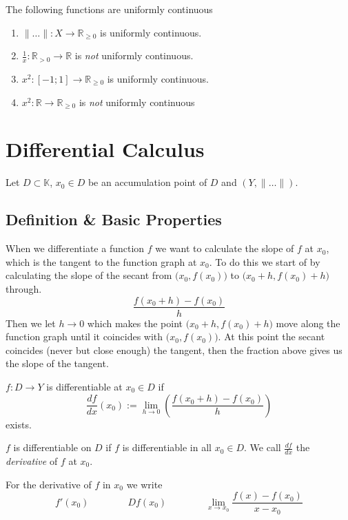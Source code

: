 \begin{proposition}
   The following functions are uniformly continuous
   \begin{enumerate}[label=\roman*, align=Center]
      \item \(\|\ldots\|: X \to \mathbb{R}_{\geq 0}\) is uniformly continuous.
      \item \(\frac{1}{x}: \mathbb{R}_{>0} \to \mathbb{R}\) is \emph{not} uniformly continuous.
      \item \(x^2: [-1; 1] \to \mathbb{R}_{\geq 0}\) is uniformly continuous.
      \item \(x^2: \mathbb{R} \to \mathbb{R}_{\geq 0}\) is \emph{not} uniformly continuous
   \end{enumerate}
\end{proposition}

\newpage

\section{Differential Calculus}
Let \(D \subset \mathbb{K}\), \(x_0 \in D\) be an accumulation point of \(D\) and \((Y, \|\ldots\|)\).

\subsection{Definition \& Basic Properties}
When we differentiate a function \(f\) we want to calculate the slope of \(f\) at \(x_0\), which is the tangent to the function graph at \(x_0\).
To do this we start of by calculating the slope of the secant from \(\big(x_0, f(x_0)\big)\) to \(\big(x_0 + h, f(x_0) + h\big)\) through.
\[\frac{f(x_0 + h) - f(x_0)}{h}\]
Then we let \(h \to 0\) which makes the point \(\big(x_0 + h, f(x_0) + h\big)\) move along the function graph until it coincides with \(\big(x_0, f(x_0)\big)\).
At this point the secant coincides (never but close enough) the tangent, then the fraction above gives us the slope of the tangent.
\begin{center}
   
\end{center}

\begin{definition}
   \(f: D \to Y\) is differentiable at \(x_0 \in D\) if
   \[\frac{df}{dx}(x_0) := \lim_{h \to 0}\left(\frac{f(x_0 + h) - f(x_0)}{h}\right)\]
   exists.
\end{definition}
\begin{remark}[Terminology]
   \(f\) is differentiable on \(D\) if \(f\) is differentiable in all \(x_0 \in D\).
   We call \(\frac{df}{dx}\) the \emph{derivative} of \(f\) at \(x_0\).
\end{remark}
\begin{remark}[Notation]
   For the derivative of \(f\) in \(x_0\) we write
   \[f'(x_0) \qquad\qquad Df(x_0) \qquad\qquad \lim_{x \to x_0} \frac{f(x) - f(x_0)}{x - x_0}\]
\end{remark}

